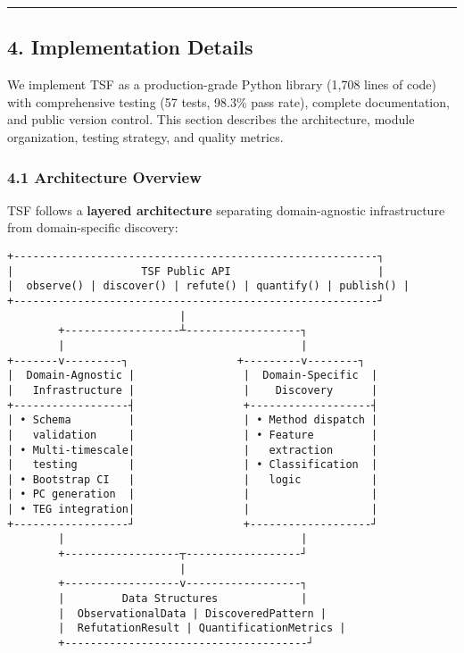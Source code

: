 \documentclass[
]{article}
\begin{document}
\begin{center}\rule{0.5\linewidth}{0.5pt}\end{center}

\subsection{4. Implementation Details}\label{implementation-details}

We implement TSF as a production-grade Python library (1,708 lines of
code) with comprehensive testing (57 tests, 98.3\% pass rate), complete
documentation, and public version control. This section describes the
architecture, module organization, testing strategy, and quality
metrics.

\subsubsection{4.1 Architecture Overview}\label{architecture-overview}

TSF follows a \textbf{layered architecture} separating domain-agnostic
infrastructure from domain-specific discovery:

\begin{verbatim}
+---------------------------------------------------------┐
|                    TSF Public API                       |
|  observe() | discover() | refute() | quantify() | publish() |
+---------------------------------------------------------┘
                           |
        +------------------┴------------------┐
        |                                     |
+-------v---------┐                 +---------v--------┐
|  Domain-Agnostic |                 |  Domain-Specific  |
|   Infrastructure |                 |    Discovery      |
+------------------┤                 +-------------------┤
| • Schema         |                 | • Method dispatch |
|   validation     |                 | • Feature         |
| • Multi-timescale|                 |   extraction      |
|   testing        |                 | • Classification  |
| • Bootstrap CI   |                 |   logic           |
| • PC generation  |                 |                   |
| • TEG integration|                 |                   |
+------------------┘                 +-------------------┘
        |                                     |
        +------------------┬------------------┘
                           |
        +------------------v------------------┐
        |         Data Structures             |
        |  ObservationalData | DiscoveredPattern |
        |  RefutationResult | QuantificationMetrics |
        +--------------------------------------┘
\end{verbatim}
\end{document}
